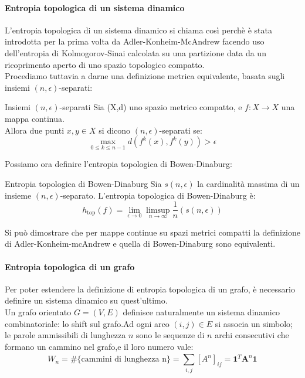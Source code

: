 \paragraph{Entropia topologica di un sistema dinamico}

L'entropia topologica di un sistema dinamico si chiama così perchè è stata introdotta per la prima volta da Adler-Konheim-McAndrew facendo uso dell'entropia di Kolmogorov-Sinai calcolata su una partizione data da un ricoprimento aperto di uno spazio topologico compatto.\\

Procediamo tuttavia a darne una definizione metrica equivalente, basata sugli insiemi $(n,\epsilon)$-separati:
\begin{boxb}{Insiemi $(n,\epsilon)$-separati}
    Sia (X,d) uno spazio metrico compatto, e $f : X \to X$ una mappa continua.\\
    Allora due punti $x,y \in X$ si dicono $(n,\epsilon)$-separati se:
    \begin{equation}
        \max_{0\le k \le n-1}d(f^k(x),f^k(y)) > \epsilon
    \end{equation}
\end{boxb}
Possiamo ora definire l'entropia topologica di Bowen-Dinaburg:
\begin{boxb}{Entropia topologica di Bowen-Dinaburg }
Sia $s(n,\epsilon)$ la cardinalità massima di un insieme $(n,\epsilon)$-separato. L'entropia topologica di Bowen-Dinaburg è:
\begin{equation}
    h_{\text{top}}(f)=\lim_{\epsilon \to 0}\limsup_{n \to \infty}\frac{1}{n}(s(n,\epsilon))
\end{equation}
\end{boxb}

Si può dimostrare che per mappe continue su spazi metrici compatti la definizione di Adler-Konheim-mcAndrew e quella di Bowen-Dinaburg sono equivalenti.\\

\paragraph{Entropia topologica di un grafo}

Per poter estendere la definizione di entropia topologica di un grafo, è necessario definire un sistema dinamico su quest'ultimo.\\
Un grafo orientato $G=(V,E)$ definisce naturalmente un sistema dinamico combinatoriale: lo shift sul grafo.Ad ogni arco $(i,j) \in E$ si associa un simbolo; le parole ammissibili di lunghezza $n$ sono le sequenze di $n$ archi consecutivi che formano un cammino nel grafo,e il loro numero vale:
\begin{equation}
    W_n= \# \{ \text{cammini di lunghezza n}\} =\sum_{i,j}^{}[A^n]_{ij}=\mathbf{1}^T\mathbf{A}^n\mathbf{1}
\end{equation}

